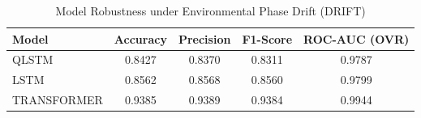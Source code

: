 \begin{table}[htbp]
\centering
\caption{Model Robustness under Environmental Phase Drift (DRIFT)}
\label{tab:drift_metrics}
\begin{tabular}{@{}lcccc@{}}
\toprule
\textbf{Model} & \textbf{Accuracy} & \textbf{Precision} & \textbf{F1-Score} & \textbf{ROC-AUC (OVR)} \\ \midrule
QLSTM & 0.8427 & 0.8370 & 0.8311 & 0.9787 \\
LSTM & 0.8562 & 0.8568 & 0.8560 & 0.9799 \\
TRANSFORMER & 0.9385 & 0.9389 & 0.9384 & 0.9944 \\
\bottomrule
\end{tabular}
\end{table}
